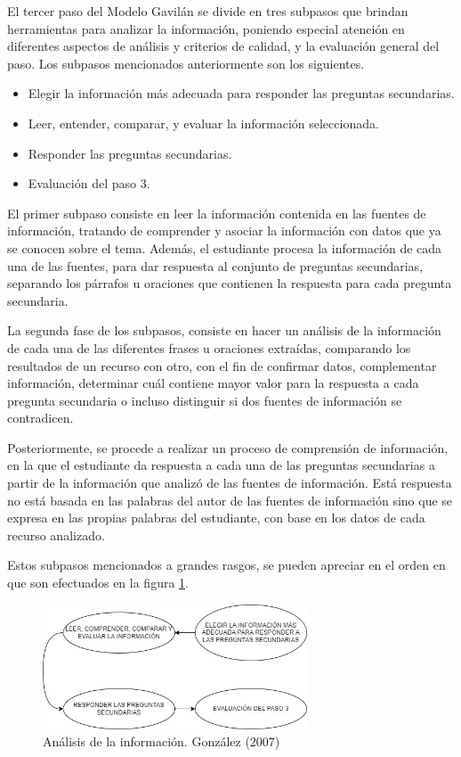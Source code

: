 El tercer paso del Modelo Gavilán se divide en tres subpasos que brindan herramientas para analizar la información, poniendo especial atención en diferentes aspectos de análisis y criterios de calidad, y la evaluación general del paso. Los subpasos mencionados anteriormente son los siguientes.

\begin{itemize}
  \item Elegir la información más adecuada para responder las preguntas secundarias.
  \item Leer, entender, comparar, y evaluar la información seleccionada.
  \item Responder las preguntas secundarias.
  \item Evaluación del paso 3.
\end{itemize}

El primer subpaso consiste en leer la información contenida en las fuentes de información, tratando de comprender y asociar la información con datos que ya se conocen sobre el tema. Además, el estudiante procesa la información de cada una de las fuentes, para dar respuesta al conjunto de preguntas secundarias, separando los párrafos u oraciones que contienen la respuesta para cada pregunta secundaria.

La segunda fase de los subpasos, consiste en hacer un análisis de la información de cada una de las diferentes frases u oraciones extraídas, comparando los resultados de un recurso con otro, con el fin de confirmar datos, complementar información, determinar cuál contiene mayor valor para la respuesta a cada pregunta secundaria o incluso distinguir si dos fuentes de información se contradicen.

Posteriormente, se procede a realizar un proceso de comprensión de información, en la que el estudiante da respuesta a cada una de las preguntas secundarias a partir de la información que analizó de las fuentes de información. Está respuesta no está basada en las palabras del autor de las fuentes de información sino que se expresa en las propias palabras del estudiante, con base en los datos de cada recurso analizado.

Estos subpasos mencionados a grandes rasgos, se pueden apreciar en el orden en que son efectuados en la figura \ref{fig:25}.

\begin{figure}
  \centering
  \includegraphics[width=0.70\textwidth]{Cap2/Figuras/Análisis de la información.jpg}
  \caption{Análisis de la información. González (2007)}
  \label{fig:25}
\end{figure}

